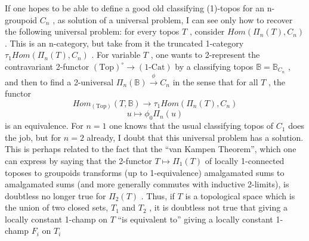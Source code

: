 If one hopes to be able to define a good old classifying (1)-topos for
an n-groupoid $C_n$ , as solution of a universal problem, I can see only how
 to recover the following universal problem: for every topos $T$ , consider
$\mathit{Hom}(\Pi_n(T), C_n)$ . This is an n-category, but take from it the truncated
1-category $\tau_1 \mathit{Hom}(\Pi_n(T), C_n)$ . For variable $T$ , one wants to 2-represent
the contravariant 2-functor $(\mathrm{Top})^{\circ} \rightarrow (1\text{-}\mathrm{Cat})$ by a classifying topos
$\mathbb{B} = \mathbb{B}_{C_n}$ , and then to find a 2-universal $\Pi_n(\mathbb{B}) \xrightarrow{\ \phi\ } C_n$ in the sense that
for all $T$ , the functor
\[ \mathit{Hom}_{(\mathrm{Top})}(T, \mathbb{B}) \longrightarrow \tau_1 \mathit{Hom}(\Pi_n(T), C_n) \]
\[ u \longmapsto \phi_0 \Pi_n(u) \]
is an equivalence. For $n = 1$ one knows that the usual classifying topos
of $C_1$ does the job, but for $n = 2$ already, I doubt that this universal
problem has a solution. This is perhaps related to the fact that the
``van Kampen Theorem'', which one can express by saying that the 2-functor
$T \longmapsto \Pi_1(T)$ of locally 1-connected toposes to groupoids transforms (up to
1-equivalence) amalgamated sums to amalgamated sums (and more generally commutes
with inductive 2-limits), is doubtless no longer true for $\Pi_2(T)$ . Thus,
if $T$ is a topological space which is the union of two closed sets, $T_1$ and
$T_2$ , it is doubtless not true that giving a locally constant 1-champ
on $T$ ``is equivalent to'' giving a locally constant 1-champ $F_i$ on $T_i$

